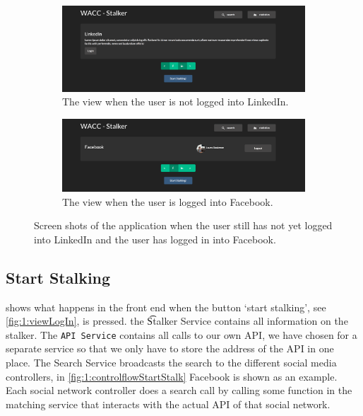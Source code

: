 	\begin{figure}
		\begin{subfigure}{\textwidth}
			\includegraphics[width=\textwidth]{./img/1_login_view_logged_out}
			\caption{The view when the user is not logged into LinkedIn.}
			\label{fig:1:viewLogIn:linkedin}
		\end{subfigure}
		\begin{subfigure}{\textwidth}
			\includegraphics[width=\textwidth]{./img/1_login_view_logged_in}
			\caption{The view when the user is logged into Facebook.}
			\label{fig:1:viewLogIn:facebook}
		\end{subfigure}			
		\caption{Screen shots of the application when  the user still has not yet logged into LinkedIn and  the user has logged in into Facebook.}
		\label{fig:1:viewLogIn}
	\end{figure}	

\subsection{Start Stalking}
\label{ss:1:startStalking}
	 shows what happens in the front end when the button `start stalking', see \autoref{fig:1:viewLogIn}, is pressed. the \t{Stalker Service} contains all information on the stalker. The \texttt{API Service} contains all calls to our own API, we have chosen for a separate service so that we only have to store the address of the API in one place. The Search Service broadcasts the search to the different social media controllers, in \cref{fig:1:controlflowStartStalk} Facebook is shown as an example. Each social network controller does a search call by calling some function in the matching service that interacts with the actual API of that social network.


